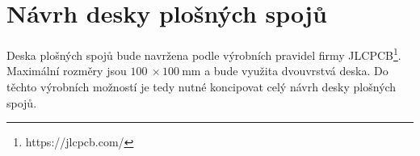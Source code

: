 \chapter{Návrh desky plošných spojů}

Deska plošných spojů bude navržena podle výrobních pravidel firmy JLCPCB\footnote{https://jlcpcb.com/}. Maximální rozměry jsou $\SI{100}{}\times \SI{100}{\milli\metre}$ a bude využita dvouvrstvá deska. Do těchto výrobních možností je tedy nutné koncipovat celý návrh desky plošných spojů.